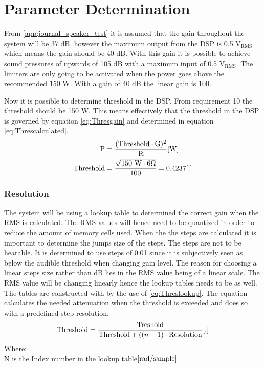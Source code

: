 \section{Parameter Determination}
From \autoref{app:journal_speaker_test} it is assumed that the gain throughout the system will be 37 dB, however the maximum output from the DSP is 0.5 $\text{V}_\text{RMS}$ which means the gain should be 40 dB. With this gain it is possible to achieve sound pressures of upwards of 105 dB with a maximum input of 0.5 $\text{V}_\text{RMS}$. The limiters are only going to be activated when the power goes above the recommended 150 W. With a gain of 40 dB the linear gain is 100.

Now it is possible to determine threshold in the DSP. From requirement 10 the threshold should be 150 W.  This means effectively that the threshold in the DSP is governed by equation \ref{eq:Thresgain} and determined in equation \ref{eq:Threscalculated}.
\vspace{-3mm}
\begin{align}
\text{P}&=\frac{(\text{Threshold} \cdot \text{G})^2}{\text{R}} \enhed{W}\label{eq:Thresgain}
\\
\text{Threshold}&=\frac{\sqrt{150 \text{ W} \cdot 6 \Omega }}{100}=0.4237\enhed{.}\label{eq:Threscalculated}
\end{align}


\subsubsection*{Resolution}

The system will be using a lookup table to determined the correct gain when the RMS is calculated. The RMS values will hence need to be quantized in order to reduce the amount of memory cells used. When the the steps are calculated it is important to determine the jumps size of the steps. The steps are not to be hearable. It is determined to use steps of 0.01 since it is subjectively seen as below the audible threshold when changing gain level. The reason for choosing a linear steps size rather than dB lies in the RMS value being of a linear scale. The RMS value will be changing linearly hence the lookup tables needs to be as well. The tables are constructed with by the use of \autoref{eq:Threslookup}. The equation calculates the needed attenuation when the threshold is exceeded and does so with a predefined step resolution. 
\vspace{-2mm}
\begin{equation}\label{eq:Threslookup}
\text{Threshold}=\frac{\text{Treshold}}{\text{Threshold}+((n-1) \cdot \text{Resolution}}\enhed{.}
\end{equation}
Where:\\
N is the Index number in the lookup table$\enhed{rad/sample}$\\

